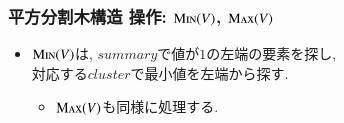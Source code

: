 \documentclass[main]{subfiles}
\begin{document}
\begin{frame}\frametitle{平方分割木構造 操作: $\mathrm{\text{M\textsc{in}}}(V)$, $\mathrm{\text{M\textsc{ax}}}(V)$}
\begin{itemize}
\item $\mathrm{\text{M\textsc{in}}}(V)$は, $summary$で値が$1$の左端の要素を探し, \\ 対応する$cluster$で最小値を左端から探す.
\begin{itemize}
	\item $\mathrm{\text{M\textsc{ax}}}(V)$も同様に処理する.
\end{itemize}
\end{itemize}
 

\end{frame}
\end{document}
